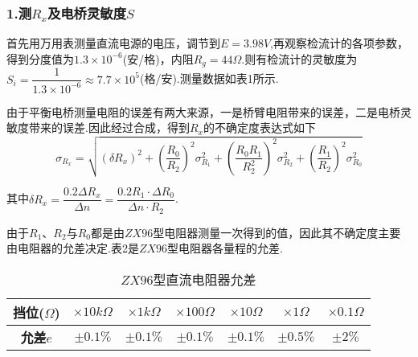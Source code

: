 \documentclass[12pt,a4paper,UTF8]{ctexart}
\begin{document}
\subsubsection*{1.测$R_x$及电桥灵敏度$S$}
首先用万用表测量直流电源的电压，调节到$E=3.98V$,再观察检流计的各项参数，得到分度值为$1.3\times10^{-6}$(安/格)，内阻$R_g=44\Omega$.则有检流计的灵敏度为$S_i=\dfrac{1}{1.3\times10^{-6}}\approx7.7\times10^{5}$(格/安).测量数据如表1所示.
\begin{table}[htbp]
\centering
\caption{$R_x$与$S$测量表}
\end{table}
\par
由于平衡电桥测量电阻的误差有两大来源，一是桥臂电阻带来的误差，二是电桥灵敏度带来的误差.因此经过合成，得到$R_x$的不确定度表达式如下
\begin{equation}
\sigma_{R_x}=\sqrt{(\delta R_x)^2+(\frac{R_0}{R_2})^2\sigma_{R_1}^2+(\frac{R_0R_1}{R_2^2})^2\sigma_{R_2}^2+(\frac{R_1}{R_2})^2\sigma_{R_0}^2} \tag{14.1}
\end{equation}
\par
其中$\delta R_x=\dfrac{0.2\Delta R_x}{\Delta n}=\dfrac{0.2R_1\cdot\Delta R_0}{\Delta n\cdot R_2}$.\par
由于$R_1$、$R_2$与$R_0$都是由$ZX96$型电阻器测量一次得到的值，因此其不确定度主要由电阻器的允差决定.表2是$ZX96$型电阻器各量程的允差.
\begin{table}[htbp]
\centering
\caption{$ZX96$型直流电阻器允差}
\begin{tabular}{|c|c|c|c|c|c|c|}
\hline
\textbf{挡位($\Omega$)}&$\times10k\Omega$&$\times 1k\Omega$&$\times100\Omega$&$\times10\Omega$&$\times1\Omega$&$\times0.1\Omega$ \\
\hline
\textbf{允差$e$}&$\pm0.1\%$&$\pm0.1\%$&$\pm0.1\%$&$\pm0.1\%$&$\pm0.5\%$&$\pm2\%$ \\
\hline
\end{tabular}
\end{table}
\end{document}
